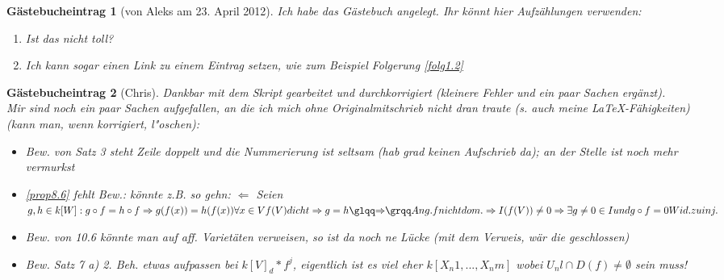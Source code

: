 \documentclass[a4paper, 12pt, numbers=noendperiod, chapterprefix=true]{scrbook}
\theoremstyle{break}
\theoremstyle{nonumberbreak}
\newtheorem{gast}{G\"astebucheintrag}
\theoremstyle{nonumberplain}
\newcommand{\quot}[1]{\textrm{\glqq}{#1}\textrm{\grqq}}
\begin{document}
\begin{gast}[von Aleks am 23. April 2012]
Ich habe das G\"astebuch angelegt. Ihr k\"onnt hier Aufz\"ahlungen verwenden:
\begin{enumerate}[1)]
\item
	Ist das nicht toll?
\item
	Ich kann sogar einen Link zu einem Eintrag setzen, wie zum Beispiel Folgerung \ref{folg1.2}
\end{enumerate}
\end{gast}

\begin{gast}[Chris]
Dankbar mit dem Skript gearbeitet und durchkorrigiert (kleinere Fehler und ein paar Sachen erg\"anzt).\\
Mir sind noch ein paar Sachen aufgefallen, an die ich mich ohne Originalmitschrieb nicht dran traute (s. auch meine LaTeX-F\"ahigkeiten) (kann man, wenn korrigiert, l"oschen):
\begin{itemize}
\item Bew. von Satz 3 steht Zeile doppelt und die Nummerierung ist seltsam (hab grad keinen Aufschrieb da); an der Stelle ist noch mehr vermurkst
\item \ref{prop8.6} fehlt Bew.: k\"onnte z.B. so gehn: \quot{$ \Leftarrow $} Seien $g,h \in k[W]: g \circ f=h \circ f \Rightarrow g(f(x))=h(f(x)) \forall x \in V f(V) dicht \Rightarrow g=h    \quot{\Rightarrow} Ang. f nicht dom. \Rightarrow I(f(V))\neq {0} \Rightarrow \exists g \neq 0 \in I und g \circ f=0 Wid. zu inj.$
\item Bew. von 10.6 k\"onnte man auf aff. Variet\"aten verweisen, so ist da noch ne L\"ucke (mit dem Verweis, w\"ar die geschlossen)
\item Bew. Satz 7 a) 2. Beh. etwas aufpassen bei $k[V]_d * f^j$, eigentlich ist es viel eher $k[X_n1,...,X_nm]$ wobei $U_nl \cap D(f) \neq \emptyset$ sein muss!
\end{itemize}
\end{gast}
\end{document}
